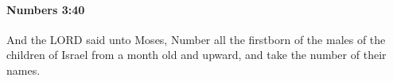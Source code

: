 
		\paragraph{Numbers 3:40} %
			\label{NUMBERS-3-40}

			And the LORD said unto Moses, Number all the firstborn of the males of the children of Israel from a month old and upward, and take the number of their names.



